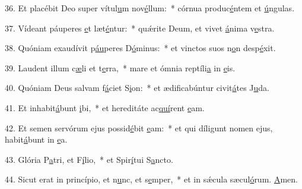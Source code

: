 36. Et placébit Deo super vítul\uline{u}m nov\uline{é}llum:~* córnua produc\uline{é}ntem et \uline{ú}ngulas.\par 
37. Vídeant páuperes \uline{e}t læt\uline{é}ntur:~* quǽrite Deum, et vivet \uline{á}nima v\uline{e}stra.\par 
38. Quóniam exaudívit p\uline{áu}peres D\uline{ó}minus:~* et vinctos suos n\uline{o}n desp\uline{é}xit.\par 
39. Laudent illum c\uline{æ}li et t\uline{e}rra,~* mare et ómnia reptíli\uline{a} in \uline{e}is.\par 
40. Quóniam Deus salvam f\uline{á}ciet S\uline{i}on:~* et ædificabúntur civit\uline{á}tes J\uline{u}da.\par 
41. Et inhabit\uline{á}bunt \uline{i}bi,~* et hereditáte ac\uline{quí}rent \uline{e}am.\par 
42. Et semen servórum ejus possid\uline{é}bit \uline{e}am:~* et qui díligunt nomen ejus, habit\uline{á}bunt in \uline{e}a.\par 
43. Glória P\uline{a}tri, et F\uline{í}lio,~* et Spir\uline{í}tui S\uline{a}ncto.\par 
44. Sicut erat in princípio, et n\uline{u}nc, et s\uline{e}mper,~* et in sǽcula sæcul\uline{ó}rum. \uline{A}men.\par 
